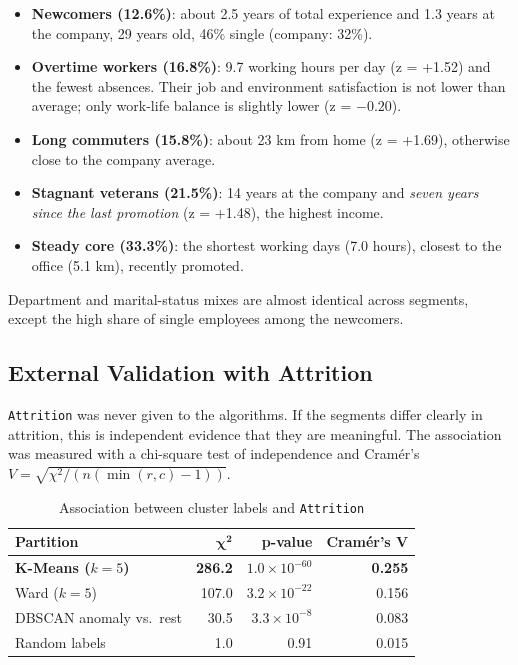 \documentclass[12pt,a4paper]{article}
\begin{document}
\begin{itemize}
  \item \textbf{Newcomers (12.6\%)}: about 2.5 years of total experience and
  1.3 years at the company, 29 years old, 46\% single (company: 32\%).
  \item \textbf{Overtime workers (16.8\%)}: 9.7 working hours per day
  (z = +1.52) and the fewest absences. Their job and environment satisfaction
  is not lower than average; only work-life balance is slightly lower
  (z = $-0.20$).
  \item \textbf{Long commuters (15.8\%)}: about 23 km from home (z = +1.69),
  otherwise close to the company average.
  \item \textbf{Stagnant veterans (21.5\%)}: 14 years at the company and
  \emph{seven years since the last promotion} (z = +1.48), the highest income.
  \item \textbf{Steady core (33.3\%)}: the shortest working days (7.0 hours),
  closest to the office (5.1 km), recently promoted.
\end{itemize}
Department and marital-status mixes are almost identical across segments,
except the high share of single employees among the newcomers.

\subsection{External Validation with Attrition}

\texttt{Attrition} was never given to the algorithms. If the segments differ
clearly in attrition, this is independent evidence that they are meaningful.
The association was measured with a chi-square test of independence and
Cramér's $V = \sqrt{\chi^2 / (n(\min(r,c)-1))}$.

\begin{table}[H]
\centering
\caption{Association between cluster labels and \texttt{Attrition}}
\label{tab:chi2}
\small
\begin{tabular}{lrrr}
\toprule
\textbf{Partition} & $\boldsymbol{\chi^2}$ & \textbf{p-value} & \textbf{Cramér's V}\\
\midrule
\textbf{K-Means ($k=5$)}     & \textbf{286.2} & $1.0\times10^{-60}$ & \textbf{0.255}\\
Ward ($k=5$)                 & 107.0 & $3.2\times10^{-22}$ & 0.156\\
DBSCAN anomaly vs.\ rest     & 30.5  & $3.3\times10^{-8}$  & 0.083\\
Random labels                & 1.0   & 0.91                & 0.015\\
\bottomrule
\end{tabular}
\end{table}
\end{document}
